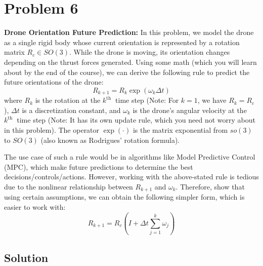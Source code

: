 \section*{Problem 6}

\textbf{Drone Orientation Future Prediction:}
In this problem, we model the drone as a single rigid body whose current orientation is represented by a rotation matrix \(R_{c} \in S O(3)\).
While the drone is moving, its orientation changes depending on the thrust forces generated.
Using some math (which you will learn about by the end of the course), we can derive the following rule to predict the future orientations of the drone:
\begin{equation*}
    R_{k+1}=R_{k} \exp \left(\omega_{k} \Delta t\right)
\end{equation*}
where \(R_{k}\) is the rotation at the \(k^{\text {th }}\) time step
(Note: For \(k=1\), we have \(R_{k}=R_{c} \)), \( \Delta t \) is a discretization constant, and \(\omega_{k}\) is the drone's angular velocity at the \(k^{\text {th }}\) time step
(Note: It has its own update rule, which you need not worry about in this problem).
The operator \(\exp (\cdot)\) is the matrix exponential from \(s o(3)\) to \(S O(3)\) (also known as Rodrigues' rotation formula).

The use case of such a rule would be in algorithms like Model Predictive Control (MPC), which make future predictions to determine the best decisions/controls/actions.
However, working with the above-stated rule is tedious due to the nonlinear relationship between \(R_{k+1}\) and \(\omega_{k}\).
Therefore, show that using certain assumptions, we can obtain the following simpler form, which is easier to work with:
\begin{equation*}
    R_{k+1}=R_{c}\left(I+\Delta t \sum_{j=1}^{k} \omega_{j}\right)
\end{equation*}

\subsection*{Solution}

